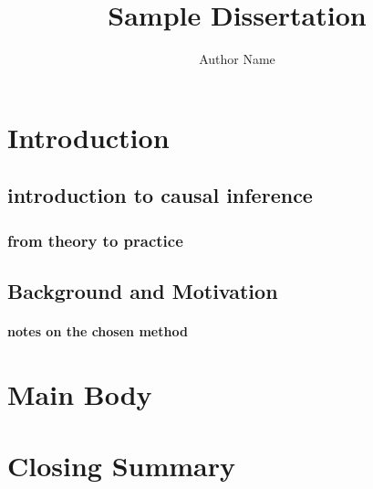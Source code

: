 \documentclass{ufdissertation}
\title{Sample Dissertation}
\author{Author Name}
\begin{document}
\chapter{Introduction}
\section{introduction to causal inference}
\subsection{from theory to practice}
\section{Background and Motivation}
\subsubsection{notes on the chosen method}
\chapter{Main Body}
\chapter{Closing Summary}
\end{document}
